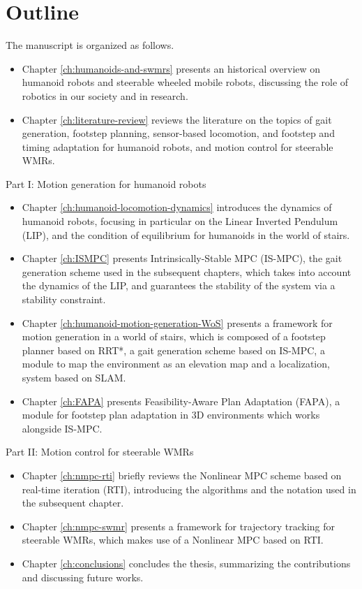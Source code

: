 \section{Outline}
The manuscript is organized as follows.
\begin{itemize}
    \item Chapter \ref{ch:humanoids-and-swmrs} presents an historical
        overview on humanoid robots and steerable wheeled mobile robots,
        discussing the role of robotics in our society and in research.
    \item Chapter \ref{ch:literature-review} reviews the literature on the topics 
        of gait generation, footstep planning, sensor-based locomotion, and footstep 
        and timing adaptation for humanoid robots, and motion control for steerable 
        WMRs.
\end{itemize}
Part I: Motion generation for humanoid robots
\begin{itemize}
    \item Chapter \ref{ch:humanoid-locomotion-dynamics} introduces the dynamics
        of humanoid robots, focusing in particular on the Linear
        Inverted Pendulum (LIP), and the condition of equilibrium for humanoids
        in the world of stairs.
    \item Chapter \ref{ch:ISMPC} presents Intrinsically-Stable MPC (IS-MPC), the gait 
        generation scheme used in the subsequent chapters,
        which takes into account the dynamics of the LIP, and guarantees the
        stability of the system via a stability constraint.
    \item Chapter \ref{ch:humanoid-motion-generation-WoS} presents a framework 
        for motion generation in a world of stairs, which is composed of a 
        footstep planner based on RRT*, a gait generation scheme based on IS-MPC,
        a module to map the environment as an elevation map and a localization, 
        system based on SLAM.
    \item Chapter \ref{ch:FAPA} presents Feasibility-Aware Plan Adaptation
        (FAPA), a module for footstep plan adaptation in 3D environments
        which works alongside IS-MPC.
\end{itemize}
Part II: Motion control for steerable WMRs
\begin{itemize}
    \item Chapter \ref{ch:nmpc-rti} briefly reviews the Nonlinear MPC scheme 
        based on real-time iteration (RTI), introducing the algorithms 
        and the notation used in the subsequent chapter.
    \item Chapter \ref{ch:nmpc-swmr} presents a framework for trajectory 
        tracking for steerable WMRs, which makes use of a Nonlinear MPC
        based on RTI.
    \item Chapter \ref{ch:conclusions} concludes the thesis, summarizing the 
        contributions and discussing future works.
\end{itemize}